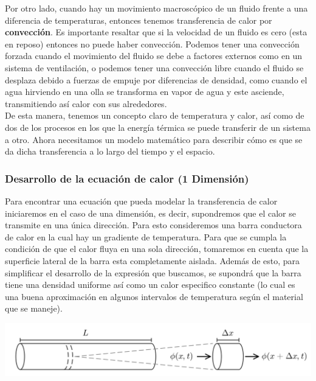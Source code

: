 \documentclass[12pt]{article}
\begin{document}
Por otro lado, cuando hay un movimiento macroscópico de un fluido frente a una diferencia de temperaturas, entonces tenemos transferencia de calor por \textbf{convección}. Es importante resaltar que si la velocidad de un fluido es cero (esta en reposo) entonces no puede haber convección. Podemos tener una convección forzada cuando el movimiento del fluido se debe a factores externos como en un sistema de ventilación, o podemos tener una convección libre cuando el fluido se desplaza debido a fuerzas de empuje por diferencias de densidad, como cuando el agua hirviendo en una olla se transforma en vapor de agua y este asciende, transmitiendo así calor con sus alrededores. \\

De esta manera, tenemos un concepto claro de temperatura y calor, así como de dos de los procesos en los que la energía térmica se puede transferir de un sistema a otro. Ahora necesitamos un modelo matemático para describir cómo es que se da dicha transferencia a lo largo del tiempo y el espacio. \\

\subsubsection{Desarrollo de la ecuación de calor (1 Dimensión)}

Para encontrar una ecuación que pueda modelar la transferencia de calor iniciaremos en el caso de una dimensión, es decir, supondremos que el calor se transmite en una única dirección. Para esto consideremos una barra conductora de calor en la cual hay un gradiente de temperatura. Para que se cumpla la condición de que el calor fluya en una sola dirección, tomaremos en cuenta que la superficie lateral de la barra esta completamente aislada. Además de esto, para simplificar el desarrollo de la expresión que buscamos, se supondrá que la barra tiene una densidad uniforme así como un calor especifico constante (lo cual es una buena aproximación en algunos intervalos de temperatura según el material que se maneje). \\

\begin{center}
    \includegraphics[width=1\linewidth]{Barra.png}
\end{center}
\end{document}
